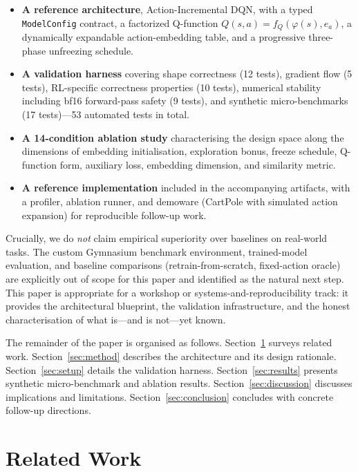 \documentclass{article}
\begin{document}
\begin{itemize}
  \item \textbf{A reference architecture}, Action-Incremental DQN, with a typed \texttt{ModelConfig} contract, a factorized Q-function $Q(s,a) = f_Q(\varphi(s), e_a)$, a dynamically expandable action-embedding table, and a progressive three-phase unfreezing schedule.
  \item \textbf{A validation harness} covering shape correctness (12 tests), gradient flow (5 tests), RL-specific correctness properties (10 tests), numerical stability including bf16 forward-pass safety (9 tests), and synthetic micro-benchmarks (17 tests)---53 automated tests in total.
  \item \textbf{A 14-condition ablation study} characterising the design space along the dimensions of embedding initialisation, exploration bonus, freeze schedule, Q-function form, auxiliary loss, embedding dimension, and similarity metric.
  \item \textbf{A reference implementation} included in the accompanying artifacts, with a profiler, ablation runner, and demoware (CartPole with simulated action expansion) for reproducible follow-up work.
\end{itemize}

Crucially, we do \emph{not} claim empirical superiority over baselines on real-world tasks. The custom Gymnasium benchmark environment, trained-model evaluation, and baseline comparisons (retrain-from-scratch, fixed-action oracle) are explicitly out of scope for this paper and identified as the natural next step. This paper is appropriate for a workshop or systems-and-reproducibility track: it provides the architectural blueprint, the validation infrastructure, and the honest characterisation of what is---and is not---yet known.

The remainder of the paper is organised as follows. Section~\ref{sec:related} surveys related work. Section~\ref{sec:method} describes the architecture and its design rationale. Section~\ref{sec:setup} details the validation harness. Section~\ref{sec:results} presents synthetic micro-benchmark and ablation results. Section~\ref{sec:discussion} discusses implications and limitations. Section~\ref{sec:conclusion} concludes with concrete follow-up directions.


\section{Related Work}
\label{sec:related}
\end{document}
